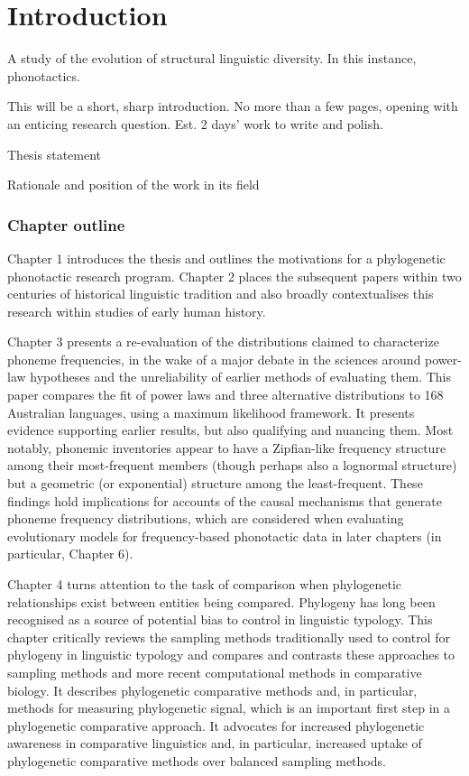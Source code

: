\chapter[Introduction]{Introduction}
\label{Chap:Intro}


A study of the evolution of structural linguistic diversity. In this instance, phonotactics.

This will be a short, sharp introduction. No more than a few pages, opening with an enticing research question. Est. 2 days' work to write and polish.

Thesis statement

Rationale and position of the work in its field

\hypertarget{chapter-outline}{%
\subsection{Chapter outline}\label{chapter-outline}}

Chapter 1 introduces the thesis and outlines the motivations for a phylogenetic phonotactic research program. Chapter 2 places the subsequent papers within two centuries of historical linguistic tradition and also broadly contextualises this research within studies of early human history.

Chapter 3 presents a re-evaluation of the distributions claimed to characterize phoneme frequencies, in the wake of a major debate in the sciences around power-law hypotheses and the unreliability of earlier methods of evaluating them. This paper compares the fit of power laws and three alternative distributions to 168 Australian languages, using a maximum likelihood framework. It presents evidence supporting earlier results, but also qualifying and nuancing them. Most notably, phonemic inventories appear to have a Zipfian-like frequency structure among their most-frequent members (though perhaps also a lognormal structure) but a geometric (or exponential) structure among the least-frequent. These findings hold implications for accounts of the causal mechanisms that generate phoneme frequency distributions, which are considered when evaluating evolutionary models for frequency-based phonotactic data in later chapters (in particular, Chapter 6).

Chapter 4 turns attention to the task of comparison when phylogenetic relationships exist between entities being compared. Phylogeny has long been recognised as a source of potential bias to control in linguistic typology. This chapter critically reviews the sampling methods traditionally used to control for phylogeny in linguistic typology and compares and contrasts these approaches to sampling methods and more recent computational methods in comparative biology. It describes phylogenetic comparative methods and, in particular, methods for measuring phylogenetic signal, which is an important first step in a phylogenetic comparative approach. It advocates for increased phylogenetic awareness in comparative linguistics and, in particular, increased uptake of phylogenetic comparative methods over balanced sampling methods.

